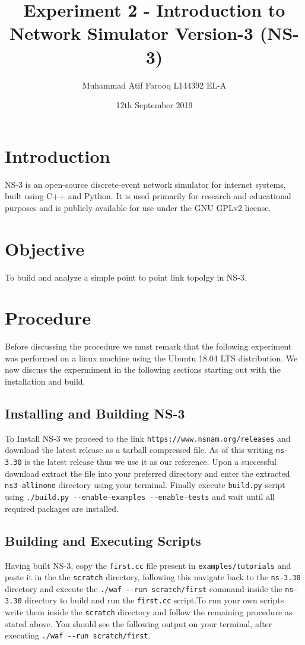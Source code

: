 \documentclass[fullpage]{article}
\begin{document}
   \title{Experiment 2 - Introduction to Network Simulator Version-3 (NS-3)}

   \author{Muhammad Atif Farooq L144392 EL-A}

   \date{12th September 2019}

   \maketitle

\section{Introduction}
NS-3 is an open-source discrete-event network simulator for internet systems,
built using C++ and Python. It is used primarily for research and educational
purposes and is publicly available for use under the GNU GPLv2 license.

\section{Objective}
To build and analyze a simple point to point link topolgy in NS-3.

\section{Procedure}
Before discussing the procedure we must remark that the following experiment was
performed on a linux machine using the Ubuntu 18.04 LTS distribution. We now discuss the expermiment 
in the following sections starting out with the installation and build.

\subsection{Installing and Building NS-3}
To Install NS-3 we proceed to the link \verb|https://www.nsnam.org/releases| and download
the latest release as a tarball compressed file. As of this writing \verb|ns-3.30| is the latest
release thus we use it as our reference. Upon a successful download extract the file into
your preferred directory and enter the extracted \verb|ns3-allinone| directory using your terminal.
Finally execute \verb|build.py| script using \verb|./build.py --enable-examples --enable-tests|
and wait until all required packages are installed.

\subsection{Building and Executing Scripts}
Having built NS-3, copy the \verb|first.cc| file present in \verb|examples/tutorials|
and paste it in the the \verb|scratch| directory, following this navigate back to the
\verb|ns-3.30| directory and execute the \verb|./waf --run scratch/first| command
inside the \verb|ns-3.30| directory to build and run the \verb|first.cc| script.To run your own
scripts write them inside the \verb|scratch| directory and follow the remaining procedure as
stated above. You should see the following output on your terminal, after executing
\verb|./waf --run scratch/first|.
\end{document}
